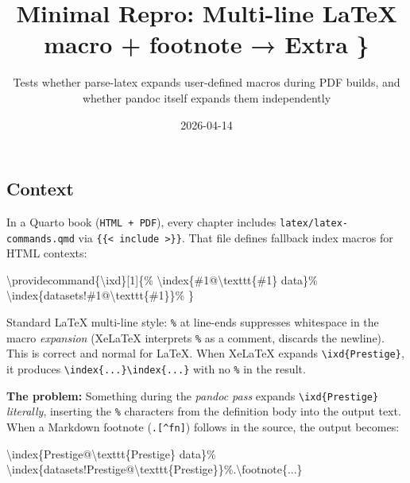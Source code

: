 \documentclass[
  letterpaper,
  DIV=11,
  numbers=noendperiod]{scrartcl}
\title{Minimal Repro: Multi-line LaTeX macro + footnote → Extra \}}
\subtitle{Tests whether parse-latex expands user-defined macros during
PDF builds, and whether pandoc itself expands them independently}
\author{}
\date{2026-04-14}
\newenvironment{Shaded}{\begin{snugshade}}{\end{snugshade}}
\newcommand{\CommentTok}[1]{\textcolor[rgb]{0.37,0.37,0.37}{#1}}
\newcommand{\ExtensionTok}[1]{\textcolor[rgb]{0.00,0.23,0.31}{#1}}
\newcommand{\FunctionTok}[1]{\textcolor[rgb]{0.28,0.35,0.67}{#1}}
\newcommand{\NormalTok}[1]{\textcolor[rgb]{0.00,0.23,0.31}{#1}}
\begin{document}
\maketitle


\subsection{Context}\label{context}

In a Quarto book (\texttt{HTML\ +\ PDF}), every chapter includes
\texttt{latex/latex-commands.qmd} via
\texttt{\{\{\textless{}\ include\ \textgreater{}\}\}}. That file defines
fallback index macros for HTML contexts:

\begin{Shaded}
\begin{Highlighting}[]
\FunctionTok{\textbackslash{}providecommand}\NormalTok{\{}\ExtensionTok{\textbackslash{}ixd}\NormalTok{\}[1]\{}\CommentTok{\%}
  \FunctionTok{\textbackslash{}index}\NormalTok{\{\#1@}\FunctionTok{\textbackslash{}texttt}\NormalTok{\{\#1\} data\}}\CommentTok{\%}
  \FunctionTok{\textbackslash{}index}\NormalTok{\{datasets!\#1@}\FunctionTok{\textbackslash{}texttt}\NormalTok{\{\#1\}\}}\CommentTok{\%}
\NormalTok{\}}
\end{Highlighting}
\end{Shaded}

Standard LaTeX multi-line style: \texttt{\%} at line-ends suppresses
whitespace in the macro \emph{expansion} (XeLaTeX interprets \texttt{\%}
as a comment, discards the newline). This is correct and normal for
LaTeX. When XeLaTeX expands \texttt{\textbackslash{}ixd\{Prestige\}}, it
produces
\texttt{\textbackslash{}index\{...\}\textbackslash{}index\{...\}} with
no \texttt{\%} in the result.

\textbf{The problem:} Something during the \emph{pandoc pass} expands
\texttt{\textbackslash{}ixd\{Prestige\}} \emph{literally}, inserting the
\texttt{\%} characters from the definition body into the output text.
When a Markdown footnote (\texttt{.{[}\^{}fn{]}}) follows in the source,
the output becomes:

\begin{Shaded}
\begin{Highlighting}[]
\FunctionTok{\textbackslash{}index}\NormalTok{\{Prestige@}\FunctionTok{\textbackslash{}texttt}\NormalTok{\{Prestige\} data\}}\CommentTok{\%}
\FunctionTok{\textbackslash{}index}\NormalTok{\{datasets!Prestige@}\FunctionTok{\textbackslash{}texttt}\NormalTok{\{Prestige\}\}}\CommentTok{\%.\textbackslash{}footnote\{...\}}
\end{Highlighting}
\end{Shaded}
\end{document}
